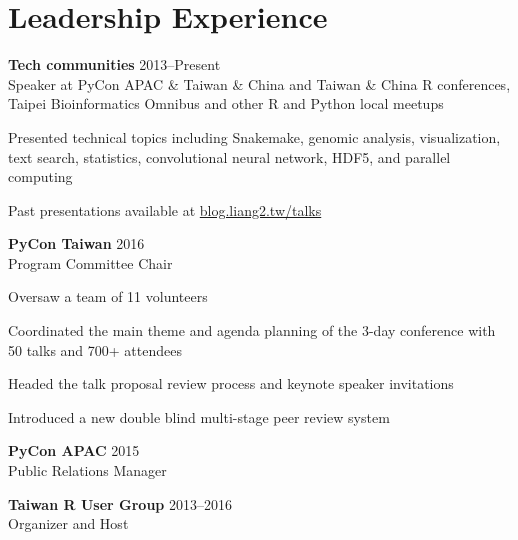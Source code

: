 \section{Leadership Experience}

\begin{entrylist}

\item \textbf{Tech communities} \hfill 2013--Present\\
    Speaker at PyCon APAC \& Taiwan \& China and Taiwan \& China R conferences, Taipei Bioinformatics Omnibus and other R and Python local meetups
    \begin{detaillist}
        \item Presented technical topics including Snakemake, genomic analysis, visualization, text search, statistics, convolutional neural network, HDF5, and parallel computing
        \item Past presentations available at \href{https://blog.liang2.tw/talks/}{blog.liang2.tw/talks}
    \end{detaillist}

\item \textbf{PyCon Taiwan} \hfill 2016\\
    Program Committee Chair
    \begin{detaillist}
        \item Oversaw a team of 11 volunteers
        \item Coordinated the main theme and agenda planning of the 3-day conference with 50 talks and 700+ attendees
        \item Headed the talk proposal review process and keynote speaker invitations
        \item Introduced a new double blind multi-stage peer review system
    \end{detaillist}

\item \textbf{PyCon APAC} \hfill 2015\\
    Public Relations Manager

\item \textbf{Taiwan R User Group} \hfill 2013--2016\\
    Organizer and Host
\end{entrylist}
